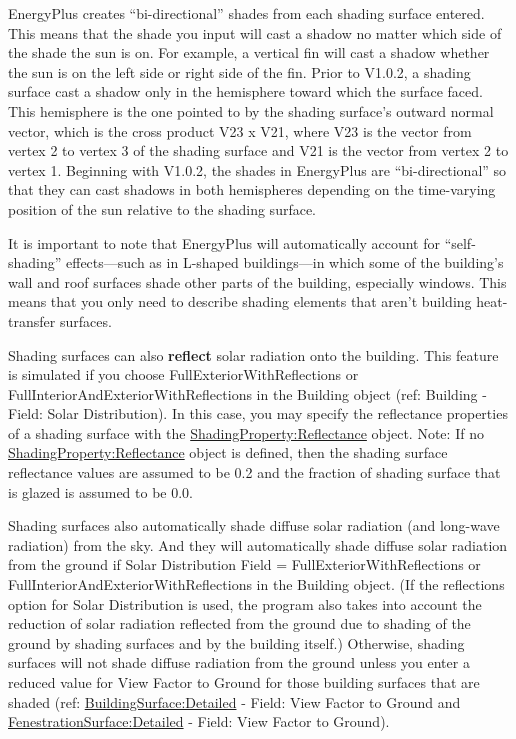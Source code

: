 EnergyPlus creates ``bi-directional'' shades from each shading surface entered. This means that the shade you input will cast a shadow no matter which side of the shade the sun is on. For example, a vertical fin will cast a shadow whether the sun is on the left side or right side of the fin. Prior to V1.0.2, a shading surface cast a shadow only in the hemisphere toward which the surface faced. This hemisphere is the one pointed to by the shading surface's outward normal vector, which is the cross product V23 x V21, where V23 is the vector from vertex 2 to vertex 3 of the shading surface and V21 is the vector from vertex 2 to vertex 1. Beginning with V1.0.2, the shades in EnergyPlus are ``bi-directional'' so that they can cast shadows in both hemispheres depending on the time-varying position of the sun relative to the shading surface.

It is important to note that EnergyPlus will automatically account for ``self-shading'' effects---such as in L-shaped buildings---in which some of the building's wall and roof surfaces shade other parts of the building, especially windows. This means that you only need to describe shading elements that aren't building heat-transfer surfaces.

Shading surfaces can also \textbf{reflect} solar radiation onto the building. This feature is simulated if you choose FullExteriorWithReflections or FullInteriorAndExteriorWithReflections in the Building object (ref: Building - Field: Solar Distribution). In this case, you may specify the reflectance properties of a shading surface with the \hyperref[shadingpropertyreflectance]{ShadingProperty:Reflectance} object. Note: If no \hyperref[shadingpropertyreflectance]{ShadingProperty:Reflectance} object is defined, then the shading surface reflectance values are assumed to be 0.2 and the fraction of shading surface that is glazed is assumed to be 0.0.

Shading surfaces also automatically shade diffuse solar radiation (and long-wave radiation) from the sky. And they will automatically shade diffuse solar radiation from the ground if Solar Distribution Field = FullExteriorWithReflections or FullInteriorAndExteriorWithReflections in the Building object. (If the reflections option for Solar Distribution is used, the program also takes into account the reduction of solar radiation reflected from the ground due to shading of the ground by shading surfaces and by the building itself.) Otherwise, shading surfaces will not shade diffuse radiation from the ground unless you enter a reduced value for View Factor to Ground for those building surfaces that are shaded (ref: \hyperref[buildingsurfacedetailed]{BuildingSurface:Detailed} - Field: View Factor to Ground and \hyperref[fenestrationsurfacedetailed]{FenestrationSurface:Detailed} - Field: View Factor to Ground).

